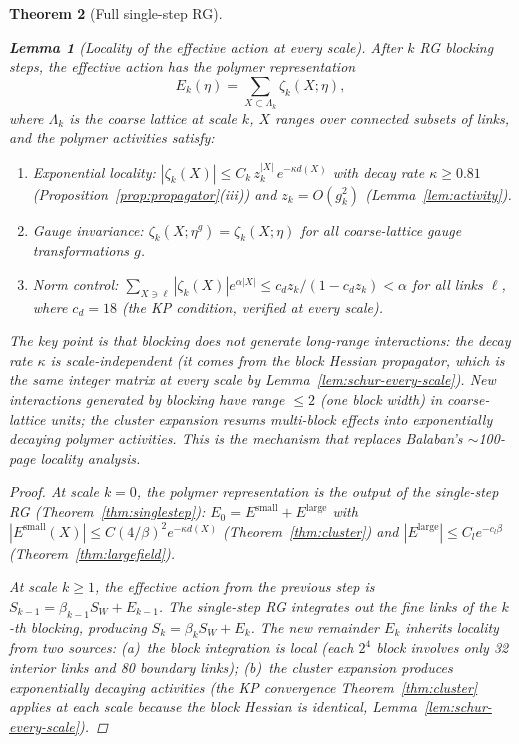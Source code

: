 \documentclass[11pt]{article}
\newtheorem{theorem}{Theorem}[section]
\newtheorem{lemma}[theorem]{Lemma}
\theoremstyle{definition}
\begin{document}
\begin{theorem}[Full single-step RG]
\begin{lemma}[Locality of the effective action at every scale]%
\label{lem:rg-locality}
After $k$ RG blocking steps, the effective action has the
polymer representation
\begin{equation}
E_k(\eta)=\sum_{X\subset\Lambda_k}\zeta_k(X;\eta),
\end{equation}
where $\Lambda_k$ is the coarse lattice at scale $k$,
$X$ ranges over connected subsets of links, and the
polymer activities satisfy:
\begin{enumerate}[nosep,label=(\roman*)]
\item \emph{Exponential locality:}
$|\zeta_k(X)|\le C_k\,z_k^{|X|}\,e^{-\kappa d(X)}$
with decay rate $\kappa\ge 0.81$
(Proposition~\ref{prop:propagator}(iii))
and $z_k=O(g_k^2)$ (Lemma~\ref{lem:activity}).
\item \emph{Gauge invariance:}
$\zeta_k(X;\eta^g)=\zeta_k(X;\eta)$ for all coarse-lattice
gauge transformations $g$.
\item \emph{Norm control:}
$\sum_{X\ni\ell}|\zeta_k(X)|e^{\alpha|X|}
\le c_d z_k/(1-c_d z_k)<\alpha$ for all links $\ell$,
where $c_d=18$ (the KP condition, verified at every scale).
\end{enumerate}
The key point is that blocking does \emph{not} generate
long-range interactions: the decay rate $\kappa$ is
\emph{scale-independent} (it comes from the block Hessian
propagator, which is the same integer matrix at every scale
by Lemma~\ref{lem:schur-every-scale}).
New interactions generated by blocking have range $\le 2$
(one block width) in coarse-lattice units;
the cluster expansion resums multi-block effects into
exponentially decaying polymer activities.
This is the mechanism that replaces Balaban's
$\sim$100-page locality analysis.
\end{lemma}

\begin{proof}
At scale $k=0$, the polymer representation is the output of
the single-step RG (Theorem~\ref{thm:singlestep}):
$E_0=E^{\mathrm{small}}+E^{\mathrm{large}}$ with
$|E^{\mathrm{small}}(X)|\le C(4/\beta)^2 e^{-\kappa d(X)}$
(Theorem~\ref{thm:cluster}) and
$|E^{\mathrm{large}}|\le C_l e^{-c_l\beta}$
(Theorem~\ref{thm:largefield}).

At scale $k\ge 1$, the effective action from the previous step
is $S_{k-1}=\beta_{k-1}S_W+E_{k-1}$.  The single-step RG
integrates out the fine links of the $k$-th blocking, producing
$S_k=\beta_k S_W+E_k$.  The new remainder $E_k$ inherits
locality from two sources:
(a)~the block integration is local (each $2^4$ block involves
only 32 interior links and 80 boundary links);
(b)~the cluster expansion produces exponentially decaying
activities (the KP convergence Theorem~\ref{thm:cluster}
applies at each scale because the block Hessian is identical,
Lemma~\ref{lem:schur-every-scale}).


\end{proof}
\end{theorem}
\end{document}
